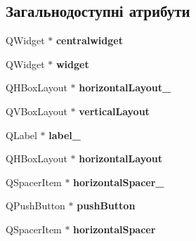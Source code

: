 \subsection*{Загальнодоступні атрибути}
\begin{DoxyCompactItemize}
\item 
\hypertarget{classUi__UserScreen_adc92cff7af8f422e5dcfaa77222cb3f2}{Q\-Widget $\ast$ {\bfseries centralwidget}}\label{classUi__UserScreen_adc92cff7af8f422e5dcfaa77222cb3f2}

\item 
\hypertarget{classUi__UserScreen_a95dc3007529cc02c13c783611d34765b}{Q\-Widget $\ast$ {\bfseries widget}}\label{classUi__UserScreen_a95dc3007529cc02c13c783611d34765b}

\item 
\hypertarget{classUi__UserScreen_ae811c33aa253daf14a377b414b4baca1}{Q\-H\-Box\-Layout $\ast$ {\bfseries horizontal\-Layout\-\_}}\label{classUi__UserScreen_ae811c33aa253daf14a377b414b4baca1}

\item 
\hypertarget{classUi__UserScreen_aab9db9b572882f931025c2fca460c52b}{Q\-V\-Box\-Layout $\ast$ {\bfseries vertical\-Layout}}\label{classUi__UserScreen_aab9db9b572882f931025c2fca460c52b}

\item 
\hypertarget{classUi__UserScreen_ae74ff2cc9500a895a1b24efa1ba10ffe}{Q\-Label $\ast$ {\bfseries label\-\_}}\label{classUi__UserScreen_ae74ff2cc9500a895a1b24efa1ba10ffe}

\item 
\hypertarget{classUi__UserScreen_a58e22c3f9eeeacc28cca723d1c9fc2ee}{Q\-H\-Box\-Layout $\ast$ {\bfseries horizontal\-Layout}}\label{classUi__UserScreen_a58e22c3f9eeeacc28cca723d1c9fc2ee}

\item 
\hypertarget{classUi__UserScreen_a141635bf864747eacafe8667858f2118}{Q\-Spacer\-Item $\ast$ {\bfseries horizontal\-Spacer\-\_}}\label{classUi__UserScreen_a141635bf864747eacafe8667858f2118}

\item 
\hypertarget{classUi__UserScreen_a029f748761908f5e58eb168ccd467fd0}{Q\-Push\-Button $\ast$ {\bfseries push\-Button}}\label{classUi__UserScreen_a029f748761908f5e58eb168ccd467fd0}

\item 
\hypertarget{classUi__UserScreen_a43c2e1e08a93c3dd6a9fa96ec230c993}{Q\-Spacer\-Item $\ast$ {\bfseries horizontal\-Spacer}}\label{classUi__UserScreen_a43c2e1e08a93c3dd6a9fa96ec230c993}


\end{DoxyCompactItemize}
